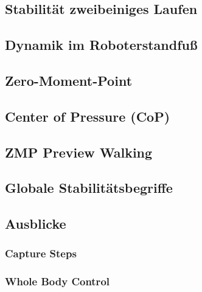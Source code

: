 \documentclass[a4paper, 11pt, accentcolor = tud3b]{tudreport}
\begin{document}
			\subsection{Stabilität zweibeiniges Laufen} %

			\subsection{Dynamik im Roboterstandfuß} %

			\subsection{Zero-Moment-Point} %

			\subsection{Center of Pressure (CoP)} %

			\subsection{ZMP Preview Walking} %

			\subsection{Globale Stabilitätsbegriffe} %

			\subsection{Ausblicke} %

				\subsubsection{Capture Steps} %

				\subsubsection{Whole Body Control} %
\end{document}
